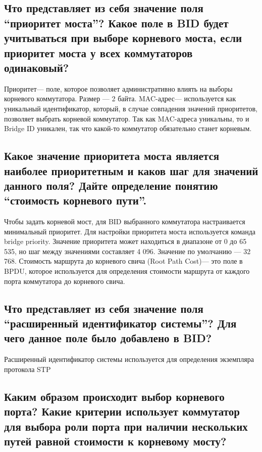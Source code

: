 \subsection{Что представляет из себя значение поля “приоритет моста”?
Какое поле в BID будет учитываться при выборе корневого моста, если
приоритет моста у всех коммутаторов одинаковый?}

Приоритет— поле, которое позволяет административно влиять на
выборы корневого коммутатора. Размер — 2 байта.
MAC-адрес— используется как уникальный идентификатор, который,
в случае совпадения значений приоритетов, позволяет выбрать корневой
коммутатор. Так как MAC-адреса уникальны, то и Bridge ID уникален, так
что какой-то коммутатор обязательно станет корневым.

\subsection{Какое значение приоритета моста является наиболее
приоритетным и каков шаг для значений данного поля? Дайте
определение понятию “стоимость корневого пути”.}

Чтобы задать корневой мост, для BID выбранного коммутатора
настраивается минимальный приоритет. Для настройки приоритета моста
используется команда bridge priority. Значение приоритета может находиться
в диапазоне от 0 до 65 535, но шаг между значениями составляет 4 096.
Значение по умолчанию — 32 768.
Стоимость маршрута до корневого свича (Root Path Cost)— это
поле в BPDU, которое используется для определения стоимости маршрута от
каждого порта коммутатора до корневого свича.

\subsection{Что представляет из себя значение поля “расширенный идентификатор
системы”? Для чего данное поле было добавлено в BID?}

Расширенный идентификатор системы используется для определения
экземпляра протокола STP


\subsection{Каким образом происходит выбор корневого порта? Какие критерии
использует коммутатор для выбора роли порта при наличии
нескольких путей равной стоимости к корневому мосту?}

